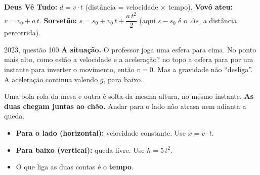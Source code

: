 \begin{macete}
\textbf{Deus Vê Tudo:} $d = v \cdot t$ (distância = velocidade $\times$ tempo).\quad
\textbf{Vovô ateu:} $v = v_0 + a\,t$.\quad
\textbf{Sorvetão:} $s = s_0 + v_0\,t + \dfrac{a\,t^2}{2}$ (aqui $s - s_0$ é o $\Delta s$, a distância percorrida).
\end{macete}

\begin{enemreal}{2023, questão 100}
\textbf{A situação.} O professor joga uma esfera para cima. No ponto mais alto, como estão a velocidade e a aceleração?
 no topo a esfera para por um instante para inverter o movimento, então $v = 0$. Mas a gravidade não
``desliga''. A aceleração continua valendo $g$, para baixo.
\end{enemreal}


\begin{minipage}[c]{0.50\linewidth}\centering
{}
\end{minipage}\hfill
\begin{minipage}[c]{0.47\linewidth}
\begin{analogia}
Uma bola rola da mesa e outra é solta da mesma altura, no mesmo instante. \textbf{As duas chegam juntas ao chão.}
Andar para o lado não atrasa nem adianta a queda.
\end{analogia}
\vspace{-2mm}
\begin{itemize}
  \item \textbf{Para o lado (horizontal):} velocidade constante. Use $x = v \cdot t$.
  \item \textbf{Para baixo (vertical):} queda livre. Use $h = 5\,t^2$.
  \item O que liga as duas contas é o \textbf{tempo}.
\end{itemize}
\end{minipage}

